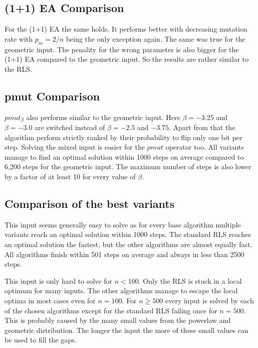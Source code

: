 \subsection{(1+1) EA Comparison}




For the (1+1) EA the same holds.
It performs better with decreasing mutation rate with $p_m=2/n$ being the only exception again.
The same was true for the geometric input.
The penality for the wrong parameter is also bigger for the (1+1) EA compared to the geometric input.
So the results are rather similar to the RLS.
\subsection{pmut Comparison}




$pmut_\beta$ also performs similar to the geometric input.
Here $\beta=-3.25$ and $\beta=-3.0$ are switched instead of $\beta = -2.5$ and $-3.75$.
Apart from that the algorithm perform strictly ranked by their probability to flip only one bit per step.
Solving the mixed input is easier for the $pmut$ operator too.
All variants manage to find an optimal solution within 1000 steps on average compared to 6,200 steps for the geometric input.
The maximum number of steps is also lower by a factor of at least 10 for every value of $\beta$.
\subsection{Comparison of the best variants}




This input seems generally easy to solve as for every base algorithm multiple variants reach an optimal solution within 1000 steps.
The standard RLS reaches an optimal solution the fastest, but the other algorithms are almost equally fast.
All algorithms finish within 501 steps on average and always in less than 2500 steps.



This input is only hard to solve for $n<100$.
Only the RLS is stuck in a local optimum for many inputs.
The other algorithms manage to escape the local optima in most cases even for $n=100$.
For $n\ge500$ every input is solved by each of the chosen algorithms except for the standard RLS failing once for $n=500$.
This is probably caused by the many small values from the powerlaw and geometric distribution.
The longer the input the more of these small values can be used to fill the gaps.

